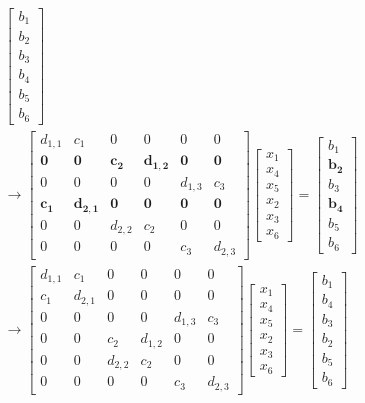 \documentclass{article}
\begin{document}
\begin{align*}
\begin{bmatrix}
        b_{1} \\ b_{2} \\ b_{3} \\ b_{4}\\ b_{5} \\ b_{6}
    \end{bmatrix} \\
    \longrightarrow \begin{bmatrix}
        d_{1,1}  & c_{1} & 0 & 0 & 0 & 0 \\
        \mathbf{0} & \mathbf{0}  & \mathbf{c_{2}} & \mathbf{d_{1,2}} & \mathbf{0}  & \mathbf{0} \\
        0 & 0 & 0& 0 & d_{1,3} & c_{3} \\
        \mathbf{c_{1}} & \mathbf{d_{2,1}} & \mathbf{0}& \mathbf{0} & \mathbf{0} & \mathbf{0} \\
        0 & 0 & d_{2,2} & c_{2} & 0  & 0 \\
        0 & 0 &0 & 0 & c_{3} & d_{2,3}
    \end{bmatrix}\begin{bmatrix}
        x_{1} \\ x_{4} \\ x_{5} \\ x_{2} \\ x_{3}\\ x_{6}
    \end{bmatrix} = \begin{bmatrix}
        b_{1} \\ \mathbf{b_{2}} \\ b_{3} \\ \mathbf{b_{4}}\\ b_{5} \\ b_{6}
    \end{bmatrix} \\
    \longrightarrow \begin{bmatrix}
        d_{1,1}  & c_{1} & 0 & 0 & 0 & 0 \\
        c_{1} & d_{2,1} & 0 & 0 & 0  & 0 \\
        0 & 0 & 0& 0 & d_{1,3} & c_{3} \\
        0 &0 & c_{2}& d_{1,2} & 0 & 0 \\
        0 & 0 & d_{2,2} & c_{2} & 0  & 0 \\
        0 & 0 &0 & 0 & c_{3} & d_{2,3}
    \end{bmatrix}\begin{bmatrix}
        x_{1} \\ x_{4} \\ x_{5} \\ x_{2} \\ x_{3}\\ x_{6}
    \end{bmatrix} = \begin{bmatrix}
        b_{1} \\ b_{4} \\ b_{3} \\ b_{2}\\ b_{5} \\ b_{6}
    \end{bmatrix}
\end{align*}
\end{document}
